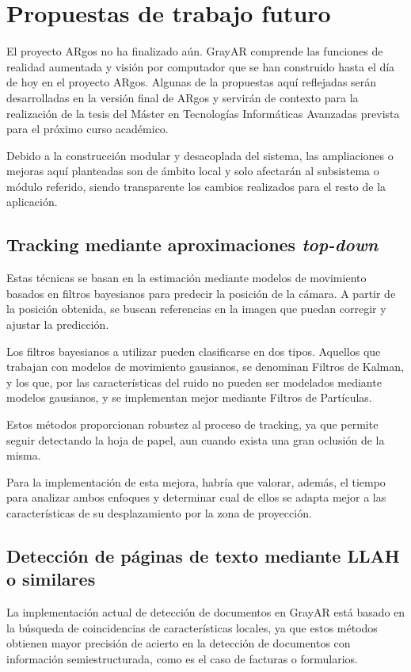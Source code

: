 \section{Propuestas de trabajo futuro}
El proyecto ARgos no ha finalizado aún. GrayAR comprende las funciones de realidad aumentada y visión por computador que se han construido hasta el día de hoy en el proyecto ARgos. Algunas de la propuestas aquí reflejadas serán desarrolladas en la versión final de ARgos y servirán de contexto para la realización de la tesis del Máster en Tecnologías Informáticas Avanzadas prevista para el próximo curso académico. 

Debido a la construcción modular y desacoplada del sistema, las ampliaciones o mejoras aquí planteadas son de ámbito local y solo afectarán al subsistema o módulo referido, siendo transparente los cambios realizados para el resto de la aplicación.
 
\subsection{Tracking mediante aproximaciones \emph{top-down}} 
Estas técnicas se basan en la estimación mediante modelos de movimiento basados en filtros bayesianos para predecir la posición de la cámara. A partir de la posición obtenida, se buscan referencias en la imagen que puedan corregir y ajustar la predicción.

Los filtros bayesianos a utilizar pueden clasificarse en dos tipos. Aquellos que trabajan con modelos de movimiento gausianos, se denominan Filtros de Kalman, y los que, por las características del ruido no pueden ser modelados mediante modelos gausianos, y se implementan mejor mediante Filtros de Partículas.

Estos métodos proporcionan robustez al proceso de tracking, ya que permite seguir detectando la hoja de papel, aun cuando exista una gran oclusión de la misma. 

Para la implementación de esta mejora, habría que valorar, además, el tiempo para analizar ambos enfoques y determinar cual de ellos se adapta mejor a las características de su desplazamiento por la zona de proyección. 

\subsection{Detección de páginas de texto mediante LLAH o similares}
La implementación actual de detección de documentos en GrayAR está basado en la búsqueda de coincidencias de características locales, ya que estos métodos obtienen mayor precisión de acierto en la detección de documentos con información semiestructurada, como es el caso de facturas o formularios. 

